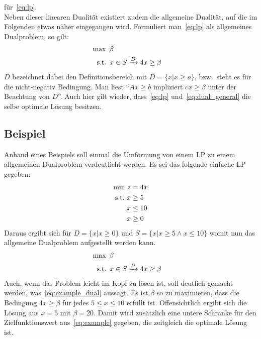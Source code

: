 \documentclass[a4paper, 11pt]{scrreprt}
\begin{document}
für~\ref{eq:lp}.\\
Neben dieser linearen Dualität existiert zudem die allgemeine Dualität, auf die im
Folgenden etwas näher eingegangen wird. Formuliert man~\ref{eq:lp} als allgemeines
Dualproblem, so gilt:
\begin{align}
  \label{eq:dual_general}
\text{max}\,\,\, \beta\\
\text{s.t.}\,\,\, x &\in S \xrightarrow{D} 4x \geq \beta\notag
\end{align}
$D$ bezeichnet dabei den Definitionsbereich mit $D = \{x|x \geq a\}$, bzw.\ steht
es für die nicht-negativ Bedingung. Man liest
``$Ax \geq b$ impliziert $cx \geq \beta$ unter der Beachtung von $D$''. Auch hier gilt
wieder, dass~\ref{eq:lp} und~\ref{eq:dual_general} die selbe optimale Lösung besitzen.

\subsection*{Beispiel}
Anhand eines Beispiels soll einmal die Umformung von einem LP zu einem allgemeinen
Dualproblem verdeutlicht werden. Es sei das folgende einfache LP gegeben:
\begin{align}
  \label{eq:example}
  \text{min}\,\, z &= 4x\notag\\
  \text{s.t.}\,\, x &\geq 5\\
  x &\leq 10\notag\\
  x &\geq 0\notag
\end{align}
Daraus ergibt sich für $D = \{x|x\geq 0\}$ und $S = \{x | x \geq 5 \land x \leq 10\}$
womit nun das allgemeine Dualproblem aufgestellt werden kann.
\begin{align}
  \label{eq:example_dual}
  \text{max}\,\,\, \beta\\
  \text{s.t.}\,\,\, x &\in S \xrightarrow{D} 4x \geq \beta\notag
\end{align}
Auch, wenn das Problem leicht im Kopf zu lösen ist, soll deutlich gemacht werden,
was~\ref{eq:example_dual} aussagt. Es ist $\beta$ so zu maximieren, dass die Bedingung
$4x \geq \beta$ für jedes $5 \leq x \leq 10$ erfüllt ist. Offensichtlich ergibt
sich die Lösung aus $x = 5$ mit  $\beta = 20$. Damit wird zusätzlich eine untere Schranke
für den Zielfunktionswert aus~\ref{eq:example} gegeben, die zeitgleich die optimale Lösung ist.
\end{document}
